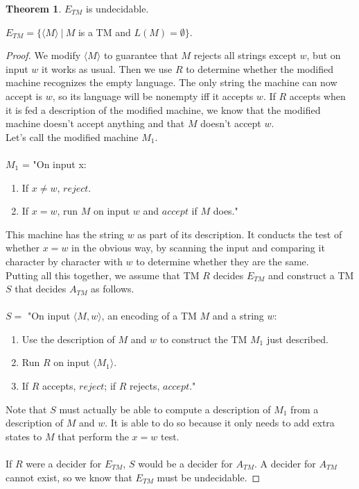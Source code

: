 \documentclass[11pt]{article}
\theoremstyle{definition}
\newtheorem{thm}{Theorem}[section]
\begin{document}
\begin{thm}
    $E_{TM}$ is undecidable.
    \begin{center}
        $E_{TM} = \{\langle M\rangle\ |\ M$ is a TM and $L(M) = \emptyset\}$.
    \end{center}
\end{thm}
\begin{proof}
    We modify $\langle M\rangle$ to guarantee that $M$ rejects all strings except $w$, but on input $w$ it works as usual. Then we use $R$ to determine whether the modified machine recognizes the empty language. The only string the machine can now accept is $w$, so its language will be nonempty iff it accepts $w$. If $R$ accepts when it is fed a description of the modified machine, we know that the modified machine doesn't accept anything and that $M$ doesn't accept $w$.\\
    Let's call the modified machine $M_1$.\\\\
    $M_1$ = "On input x:
    \begin{enumerate}
        \item If $x\neq w$, $reject$.
        \item If $x = w$, run $M$ on input $w$ and $accept$ if $M$ does."
    \end{enumerate}
    This machine has the string $w$ as part of its description. It conducts the test of whether $x = w$ in the obvious way, by scanning the input and comparing it character by character with $w$ to determine whether they are the same.\\
    Putting all this together, we assume that TM $R$ decides $E_{TM}$ and construct a TM $S$ that decides $A_{TM}$ as follows.\\\\
$S =$ "On input $\langle M,w\rangle$, an encoding of a TM $M$ and a string $w$:
\begin{enumerate}
    \item Use the description of $M$ and $w$ to construct the TM $M_1$ just described.
    \item Run $R$ on input $\langle M_1\rangle$.
    \item If $R$ accepts, $reject$; if $R$ rejects, $accept$."
\end{enumerate}
Note that $S$ must actually be able to compute a description of $M_1$ from a description of $M$ and $w$. It is able to do so because it only needs to add extra states to $M$ that perform the $x = w$ test.\\\\
If $R$ were a decider for $E_{TM}$, $S$ would be a decider for $A_{TM}$. A decider for $A_{TM}$ cannot exist, so we know that $E_{TM}$ must be undecidable.

\end{proof}
\end{document}
